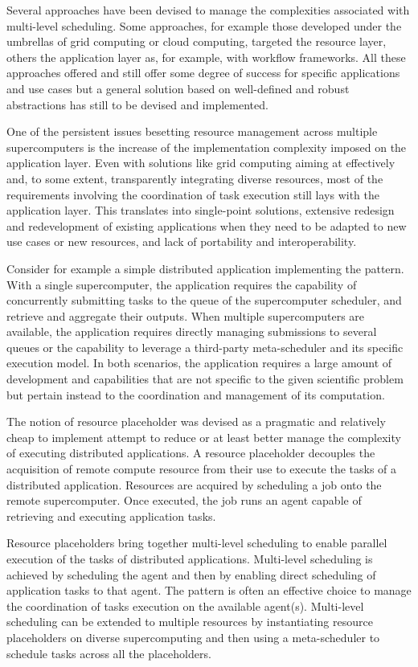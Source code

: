 \documentclass{sig-alternate}
\begin{document}
Several approaches have been devised to manage the complexities associated with
multi-level scheduling. Some approaches, for example those developed under the
umbrellas of grid computing or cloud computing, targeted the resource layer,
others the application layer as, for example, with workflow frameworks. All
these approaches offered and still offer some degree of success for specific
applications and use cases but a general solution based on well-defined and
robust abstractions has still to be devised and implemented.

One of the persistent issues besetting resource management across multiple
supercomputers is the increase of the implementation complexity imposed on the
application layer. Even with solutions like grid computing aiming at effectively
and, to some extent, transparently integrating diverse resources, most of the
requirements involving the coordination of task execution still lays with the
application layer. This translates into single-point solutions, extensive
redesign and redevelopment of existing applications when they need to be adapted
to new use cases or new resources, and lack of portability and interoperability.

Consider for example a simple distributed application implementing the \MW
pattern. With a single supercomputer, the application requires the capability of
concurrently submitting tasks to the queue of the supercomputer scheduler, and
retrieve and aggregate their outputs. When multiple supercomputers are
available, the application requires directly managing submissions to several
queues or the capability to leverage a third-party meta-scheduler and its
specific execution model. In both scenarios, the application requires a large
amount of development and capabilities that are not specific to the given
scientific problem but pertain instead to the coordination and management of its
computation.

The notion of resource placeholder was devised as a pragmatic and relatively
cheap to implement attempt to reduce or at least better manage the complexity of
executing distributed applications. A resource placeholder decouples the
acquisition of remote compute resource from their use to execute the tasks of a
distributed application. Resources are acquired by scheduling a job onto the
remote supercomputer. Once executed, the job runs an agent capable of retrieving
and executing application tasks.

Resource placeholders bring together multi-level scheduling to enable parallel
execution of the tasks of distributed applications. Multi-level scheduling is
achieved by scheduling the agent and then by enabling direct scheduling of
application tasks to that agent. The \MW pattern is often an effective choice to
manage the coordination of tasks execution on the available agent(s).
Multi-level scheduling can be extended to multiple resources by instantiating
resource placeholders on diverse supercomputing and then using a meta-scheduler
to schedule tasks across all the placeholders.
\end{document}
